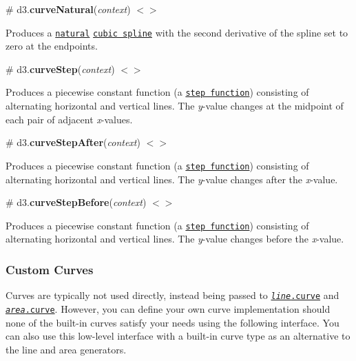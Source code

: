 \label{_curveNatural}%
\# d3.{\bfseries curve\+Natural}({\itshape context}) \href{https://github.com/d3/d3-shape/blob/master/src/curve/natural.js}{\tt $<$$>$}



Produces a \href{https://en.wikipedia.org/wiki/Spline_interpolation}{\tt natural} \href{http://mathworld.wolfram.com/CubicSpline.html}{\tt cubic spline} with the second derivative of the spline set to zero at the endpoints.

\label{_curveStep}%
\# d3.{\bfseries curve\+Step}({\itshape context}) \href{https://github.com/d3/d3-shape/blob/master/src/curve/step.js}{\tt $<$$>$}



Produces a piecewise constant function (a \href{https://en.wikipedia.org/wiki/Step_function}{\tt step function}) consisting of alternating horizontal and vertical lines. The {\itshape y}-\/value changes at the midpoint of each pair of adjacent {\itshape x}-\/values.

\label{_curveStepAfter}%
\# d3.{\bfseries curve\+Step\+After}({\itshape context}) \href{https://github.com/d3/d3-shape/blob/master/src/curve/step.js#L51}{\tt $<$$>$}



Produces a piecewise constant function (a \href{https://en.wikipedia.org/wiki/Step_function}{\tt step function}) consisting of alternating horizontal and vertical lines. The {\itshape y}-\/value changes after the {\itshape x}-\/value.

\label{_curveStepBefore}%
\# d3.{\bfseries curve\+Step\+Before}({\itshape context}) \href{https://github.com/d3/d3-shape/blob/master/src/curve/step.js#L47}{\tt $<$$>$}



Produces a piecewise constant function (a \href{https://en.wikipedia.org/wiki/Step_function}{\tt step function}) consisting of alternating horizontal and vertical lines. The {\itshape y}-\/value changes before the {\itshape x}-\/value.

\subsubsection*{Custom Curves}

Curves are typically not used directly, instead being passed to \href{#line_curve}{\tt {\itshape line}.curve} and \href{#area_curve}{\tt {\itshape area}.curve}. However, you can define your own curve implementation should none of the built-\/in curves satisfy your needs using the following interface. You can also use this low-\/level interface with a built-\/in curve type as an alternative to the line and area generators.

